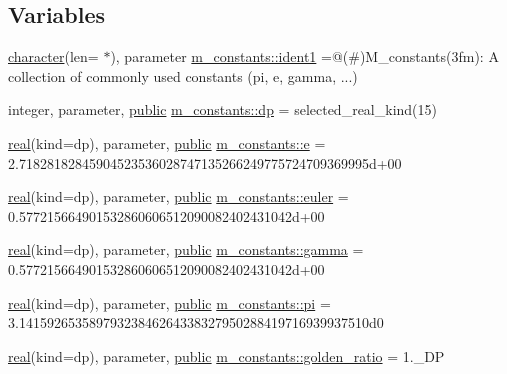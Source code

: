 \subsection*{Variables}
\begin{DoxyCompactItemize}
\item 
\hyperlink{option__stopwatch_83_8txt_abd4b21fbbd175834027b5224bfe97e66}{character}(len= $\ast$), parameter \hyperlink{namespacem__constants_a04d48a101c8ff0dc51bfe39e078339c2}{m\+\_\+constants\+::ident1} =\textquotesingle{}@(\#)M\+\_\+constants(3fm)\+: A collection of commonly used constants (pi, e, gamma, ...)\textquotesingle{}
\item 
integer, parameter, \hyperlink{M__stopwatch_83_8txt_a2f74811300c361e53b430611a7d1769f}{public} \hyperlink{namespacem__constants_a15743b6f1a6f57ab5b842d79fbffdd98}{m\+\_\+constants\+::dp} = selected\+\_\+real\+\_\+kind(15)
\item 
\hyperlink{read__watch_83_8txt_abdb62bde002f38ef75f810d3a905a823}{real}(kind=dp), parameter, \hyperlink{M__stopwatch_83_8txt_a2f74811300c361e53b430611a7d1769f}{public} \hyperlink{namespacem__constants_a79882cb1d94180e4edaed2f1c683f21b}{m\+\_\+constants\+::e} = 2.\+71828182845904523536028747135266249775724709369995d+00
\item 
\hyperlink{read__watch_83_8txt_abdb62bde002f38ef75f810d3a905a823}{real}(kind=dp), parameter, \hyperlink{M__stopwatch_83_8txt_a2f74811300c361e53b430611a7d1769f}{public} \hyperlink{namespacem__constants_a2dc8df75875a345dc61324f97e7dc780}{m\+\_\+constants\+::euler} = 0.\+577215664901532860606512090082402431042d+00
\item 
\hyperlink{read__watch_83_8txt_abdb62bde002f38ef75f810d3a905a823}{real}(kind=dp), parameter, \hyperlink{M__stopwatch_83_8txt_a2f74811300c361e53b430611a7d1769f}{public} \hyperlink{namespacem__constants_a201cd76884fb830c6f8495f821f2a895}{m\+\_\+constants\+::gamma} = 0.\+577215664901532860606512090082402431042d+00
\item 
\hyperlink{read__watch_83_8txt_abdb62bde002f38ef75f810d3a905a823}{real}(kind=dp), parameter, \hyperlink{M__stopwatch_83_8txt_a2f74811300c361e53b430611a7d1769f}{public} \hyperlink{namespacem__constants_a3ce903650fe1630c8957cdf487778e7f}{m\+\_\+constants\+::pi} = 3.\+14159265358979323846264338327950288419716939937510d0
\item 
\hyperlink{read__watch_83_8txt_abdb62bde002f38ef75f810d3a905a823}{real}(kind=dp), parameter, \hyperlink{M__stopwatch_83_8txt_a2f74811300c361e53b430611a7d1769f}{public} \hyperlink{namespacem__constants_a31fdb956c0048479c8d3d37f2b3e3edf}{m\+\_\+constants\+::golden\+\_\+ratio} = 1.\+\_\+\+DP

\end{DoxyCompactItemize}
